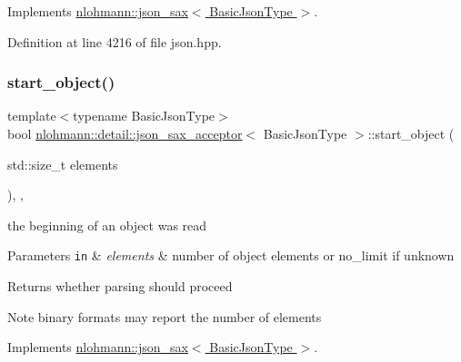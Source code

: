 Implements \hyperlink{structnlohmann_1_1json__sax_aa7717e96a46e41984260ebabab262369}{nlohmann\+::json\+\_\+sax$<$ Basic\+Json\+Type $>$}.



Definition at line 4216 of file json.\+hpp.

\mbox{\label{classnlohmann_1_1detail_1_1json__sax__acceptor_ace7998d71c96f939facaa19164316193}} 
\subsubsection{\texorpdfstring{start\+\_\+object()}{start\_object()}}
{\footnotesize\ttfamily template$<$typename Basic\+Json\+Type$>$ \\
bool \hyperlink{classnlohmann_1_1detail_1_1json__sax__acceptor}{nlohmann\+::detail\+::json\+\_\+sax\+\_\+acceptor}$<$ Basic\+Json\+Type $>$\+::start\+\_\+object (\begin{DoxyParamCaption}\item[{std\+::size\+\_\+t}]{elements }\end{DoxyParamCaption})\hspace{0.3cm}{\ttfamily [inline]}, {\ttfamily [override]}, {\ttfamily [virtual]}}



the beginning of an object was read 


\begin{DoxyParams}[1]{Parameters}
\mbox{\tt in}  & {\em elements} & number of object elements or no\+\_\+limit if unknown \\
\hline
\end{DoxyParams}
\begin{DoxyReturn}{Returns}
whether parsing should proceed 
\end{DoxyReturn}
\begin{DoxyNote}{Note}
binary formats may report the number of elements 
\end{DoxyNote}


Implements \hyperlink{structnlohmann_1_1json__sax_a447db60efaabc614492c449e640719cf}{nlohmann\+::json\+\_\+sax$<$ Basic\+Json\+Type $>$}.



